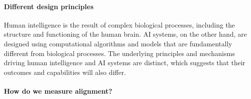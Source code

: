 \documentclass{article}
\theoremstyle{plain}
\theoremstyle{definition}
\theoremstyle{remark}
\begin{document}
\paragraph{Different design principles} 
Human intelligence is the result of complex biological processes, including the structure and functioning of the human brain. AI systems, on the other hand, are designed using computational algorithms and models that are fundamentally different from biological processes. The underlying principles and mechanisms driving human intelligence and AI systems are distinct, which suggests that their outcomes and capabilities will also differ.

\paragraph{
How do we measure alignment?
}

{


}
\end{document}
